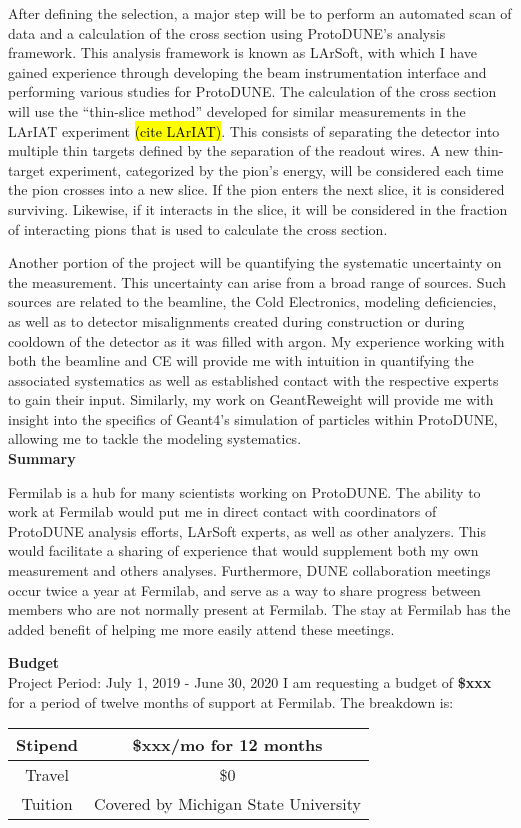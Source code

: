 \documentclass[12pt]{article}
\begin{document}
	After defining the selection, a major step will be to perform an automated scan of data and a calculation of the cross section using ProtoDUNE’s analysis framework. This analysis framework is known as LArSoft, with which I have gained experience through developing the beam instrumentation interface and performing various studies for ProtoDUNE. The calculation of the cross section will use the “thin-slice method” developed for similar measurements in the LArIAT experiment \hl{(cite LArIAT)}. This consists of separating the detector into multiple thin targets defined by the separation of the readout wires. A new thin-target experiment, categorized by the pion’s energy, will be considered each time the pion crosses into a new slice. If the pion enters the next slice, it is considered surviving. Likewise, if it interacts in the slice, it will be considered in the fraction of interacting pions that is used to calculate the cross section.
	
	Another portion of the project will be quantifying the systematic uncertainty on the measurement. This uncertainty can arise from a broad range of sources. Such sources are related to the beamline, the Cold Electronics, modeling deficiencies, as well as to detector misalignments created during construction or during cooldown of the detector as it was filled with argon. My experience working with both the beamline and CE will provide me with intuition in quantifying the associated systematics as well as established contact with the respective experts to gain their input. Similarly, my work on GeantReweight will provide me with insight into the specifics of Geant4’s simulation of particles within ProtoDUNE, allowing me to tackle the modeling systematics. 
\\

\textbf{Summary}

	Fermilab is a hub for many scientists working on ProtoDUNE. The ability to work at Fermilab would put me in direct contact with coordinators of  ProtoDUNE analysis efforts, LArSoft experts, as well as other analyzers. This would facilitate a sharing of experience that would supplement both my own measurement and others analyses. Furthermore, DUNE collaboration meetings occur twice a year at Fermilab, and serve as a way to share progress between members who are not normally present at Fermilab. The stay at Fermilab has the added benefit of helping me more easily attend these meetings. 

\newpage
\textbf{Budget}\\
Project Period: July 1, 2019 - June 30, 2020
\newline
I am requesting a budget of \textbf{\$xxx} for a period of twelve months of support at Fermilab. The breakdown is:

\begin{table}[!htb]
\begin{center}
  \begin{tabular}{| c | c |}
  \hline
  Stipend & \$xxx/mo for 12 months\\  
  \hline	
  Travel & \$0 \\
  \hline  
  Tuition & Covered by Michigan State University \\
  \hline
  \end{tabular}
\end{center}
\end{table}
\end{document}
